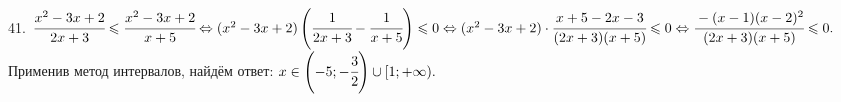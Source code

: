 41. $\cfrac{x^2-3x+2}{2x+3}\leqslant\cfrac{x^2-3x+2}{x+5}\Leftrightarrow (x^2-3x+2)\left(\cfrac{1}{2x+3}-\cfrac{1}{x+5}\right)\leqslant0
\Leftrightarrow (x^2-3x+2)\cdot\cfrac{x+5-2x-3}{(2x+3)(x+5)}\leqslant0\Leftrightarrow\cfrac{-(x-1)(x-2)^2}{(2x+3)(x+5)}\leqslant0.$ Применив метод интервалов, найдём ответ: $x\in\left(-5;-\cfrac{3}{2}\right)\cup[1;+\infty).$
\begin{figure}[ht!]
\end{figure}\\
